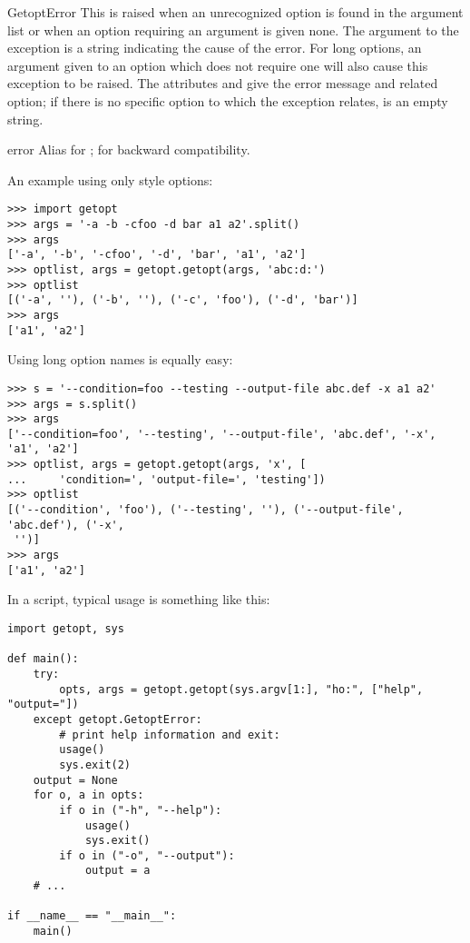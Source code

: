 \begin{excdesc}{GetoptError}
This is raised when an unrecognized option is found in the argument
list or when an option requiring an argument is given none.
The argument to the exception is a string indicating the cause of the
error.  For long options, an argument given to an option which does
not require one will also cause this exception to be raised.  The
attributes  and  give the error message and
related option; if there is no specific option to which the exception
relates,  is an empty string.
\end{excdesc}

\begin{excdesc}{error}
Alias for ; for backward compatibility.
\end{excdesc}


An example using only \UNIX{} style options:

\begin{verbatim}
>>> import getopt
>>> args = '-a -b -cfoo -d bar a1 a2'.split()
>>> args
['-a', '-b', '-cfoo', '-d', 'bar', 'a1', 'a2']
>>> optlist, args = getopt.getopt(args, 'abc:d:')
>>> optlist
[('-a', ''), ('-b', ''), ('-c', 'foo'), ('-d', 'bar')]
>>> args
['a1', 'a2']
\end{verbatim}

Using long option names is equally easy:

\begin{verbatim}
>>> s = '--condition=foo --testing --output-file abc.def -x a1 a2'
>>> args = s.split()
>>> args
['--condition=foo', '--testing', '--output-file', 'abc.def', '-x', 'a1', 'a2']
>>> optlist, args = getopt.getopt(args, 'x', [
...     'condition=', 'output-file=', 'testing'])
>>> optlist
[('--condition', 'foo'), ('--testing', ''), ('--output-file', 'abc.def'), ('-x',
 '')]
>>> args
['a1', 'a2']
\end{verbatim}

In a script, typical usage is something like this:

\begin{verbatim}
import getopt, sys

def main():
    try:
        opts, args = getopt.getopt(sys.argv[1:], "ho:", ["help", "output="])
    except getopt.GetoptError:
        # print help information and exit:
        usage()
        sys.exit(2)
    output = None
    for o, a in opts:
        if o in ("-h", "--help"):
            usage()
            sys.exit()
        if o in ("-o", "--output"):
            output = a
    # ...

if __name__ == "__main__":
    main()
\end{verbatim}
